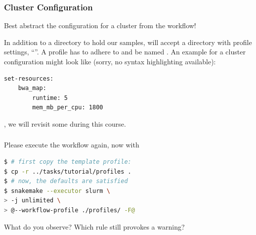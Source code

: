 \begin{frame}[fragile]
  \frametitle{Cluster Configuration}
  \begin{hint}
  	Best abstract the configuration for a cluster from the workflow!
  \end{hint}
  In addition to a  directory to hold our samples, \Snakemake{} will accept a directory with profile settings, ``''.
  \pause
  A profile has to adhere to  and be named . An example for a cluster configuration might look like (sorry, no syntax highlighting available):
  \begin{lstlisting}[style=Plain]
set-resources:
    bwa_map:
        runtime: 5
        mem_mb_per_cpu: 1800
  \end{lstlisting}
  \pause
  
  \Snakemake{} , we will revisit some during this course.

\end{frame}

\begin{frame}[fragile]
  \frametitle{}
  Please execute the workflow again, now with 
  \begin{lstlisting}[language=Bash, style=Shell, basicstyle=\footnotesize]
$ # first copy the template profile:
$ cp -r ../tasks/tutorial/profiles .
$ # now, the defaults are satisfied
$ snakemake --executor slurm \
> -j unlimited \
> @--workflow-profile ./profiles/ -F@
  \end{lstlisting}
  \begin{question}
  	What do you observe? Which rule still provokes a warning?
  \end{question}
\end{frame}

